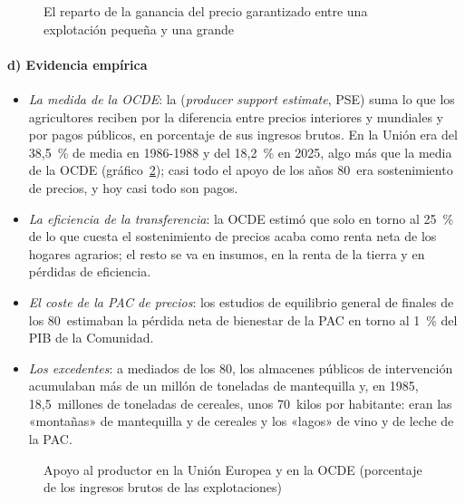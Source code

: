 \documentclass[11pt]{article}
\begin{document}
\begin{figure}[H]
\centering
\caption{El reparto de la ganancia del precio garantizado entre una explotación pequeña y una grande}\label{fig:reparto-explotaciones}
\end{figure}

\paragraph{d) Evidencia empírica}

\begin{itemize}
\item \emph{La medida de la OCDE}: la  (\emph{producer support estimate}, PSE) suma lo que los agricultores reciben por la diferencia entre precios interiores y mundiales y por pagos públicos, en porcentaje de sus ingresos brutos. En la Unión era del 38,5~\% de media en 1986-1988 y del 18,2~\% en 2025, algo más que la media de la OCDE (gráfico~\ref{fig:pse}); casi todo el apoyo de los años 80~era sostenimiento de precios, y hoy casi todo son pagos\nocite{OCDE2026Monitoring}.
\item \emph{La eficiencia de la transferencia}: la OCDE estimó que solo en torno al 25~\% de lo que cuesta el sostenimiento de precios acaba como renta neta de los hogares agrarios; el resto se va en insumos, en la renta de la tierra y en pérdidas de eficiencia\nocite{OCDE2003FarmIncome}.
\item \emph{El coste de la PAC de precios}: los estudios de equilibrio general de finales de los 80~estimaban la pérdida neta de bienestar de la PAC en torno al 1~\% del PIB de la Comunidad\nocite{CamareroTamaritAnchuelo2019}.
\item \emph{Los excedentes}: a mediados de los 80, los almacenes públicos de intervención acumulaban más de un millón de toneladas de mantequilla y, en 1985, 18,5~millones de toneladas de cereales, unos 70~kilos por habitante\nocite{BaldwinWyplosz2020Economics}: eran las «montañas» de mantequilla y de cereales y los «lagos» de vino y de leche de la PAC\nocite{PE2026FichaInstrumentos}.
\end{itemize}

\begin{figure}[H]
\centering
\caption{Apoyo al productor en la Unión Europea y en la OCDE (porcentaje de los ingresos brutos de las explotaciones)}\label{fig:pse}
\end{figure}
\end{document}
